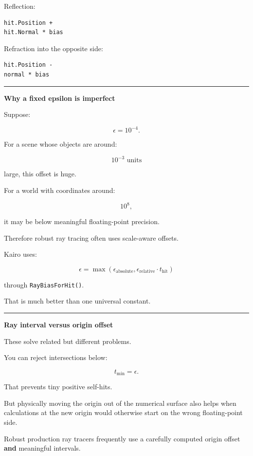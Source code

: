 Reflection:

\begin{verbatim}
hit.Position +
hit.Normal * bias
\end{verbatim}

Refraction into the opposite side:

\begin{verbatim}
hit.Position -
normal * bias
\end{verbatim}

\begin{center}\rule{0.5\linewidth}{0.5pt}\end{center}

\textbf{Why a fixed epsilon is imperfect}

Suppose:

\[
\epsilon=10^{-4}.
\]

For a scene whose objects are around:

\[
10^{-3}\text{ units}
\]

large, this offset is huge.

For a world with coordinates around:

\[
10^8,
\]

it may be below meaningful floating-point precision.

Therefore robust ray tracing often uses scale-aware offsets.

Kairo uses:

\[
\boxed{
\epsilon=
\max(
\epsilon_{\text{absolute}},
\epsilon_{\text{relative}}\cdot t_{\text{hit}}
)
}
\]

through \texttt{RayBiasForHit()}.

That is much better than one universal constant.

\begin{center}\rule{0.5\linewidth}{0.5pt}\end{center}

\textbf{Ray interval versus origin offset}

These solve related but different problems.

You can reject intersections below:

\[
t_{\min}=\epsilon.
\]

That prevents tiny positive self-hits.

But physically moving the origin out of the numerical surface also helps when calculations at the new origin would otherwise start on the wrong floating-point side.

Robust production ray tracers frequently use a carefully computed origin offset \textbf{and} meaningful intervals.

